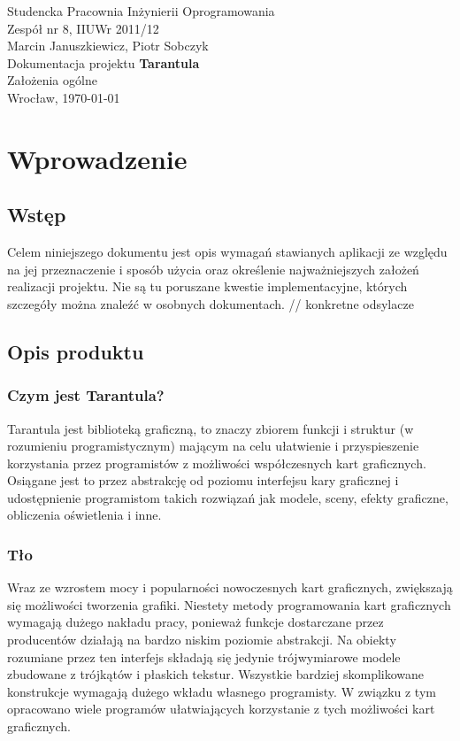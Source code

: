 \documentclass[11pt,leqno]{article}
\begin{document}
\begin{center}
\thispagestyle{empty}
{\Large Studencka Pracownia Inżynierii Oprogramowania}\\[0.5cm]
{\Large Zespół nr 8, IIUWr 2011/12}\\[2.5cm]

{\large Marcin Januszkiewicz, Piotr Sobczyk}\\[0.5cm]
{\huge Dokumentacja projektu \textbf{Tarantula}}\\[0.5cm]
{\huge Założenia ogólne}\\[0.5cm]
\vfill
{\large Wrocław, \today}
\end{center}
\newpage
\tableofcontents

\newpage


\newpage
\section{Wprowadzenie}

\subsection{Wstęp}
\noindent
Celem niniejszego dokumentu jest opis wymagań stawianych aplikacji ze względu na jej przeznaczenie i 
sposób użycia oraz określenie najważniejszych założeń realizacji projektu. 
Nie są tu poruszane kwestie implementacyjne, których szczegóły można znaleźć w osobnych dokumentach. // konkretne odsylacze

\subsection{Opis produktu}

\subsubsection{Czym jest Tarantula?}
\noindent
Tarantula jest biblioteką graficzną, to znaczy zbiorem funkcji i struktur (w rozumieniu programistycznym) mającym 
na celu ułatwienie i przyspieszenie korzystania przez programistów z możliwości współczesnych kart graficznych. Osiągane jest to przez abstrakcję od poziomu interfejsu kary graficznej i udostępnienie programistom takich rozwiązań jak modele, sceny, efekty graficzne, obliczenia oświetlenia i inne.

\subsubsection{Tło}
\noindent
Wraz ze wzrostem mocy i popularności nowoczesnych kart graficznych, zwiększają się możliwości tworzenia grafiki. 
Niestety metody programowania kart graficznych wymagają dużego nakładu pracy, ponieważ funkcje dostarczane przez producentów 
działają na bardzo niskim poziomie abstrakcji. Na obiekty rozumiane przez ten interfejs składają się jedynie trójwymiarowe modele zbudowane z trójkątów i płaskich tekstur. 
Wszystkie bardziej skomplikowane konstrukcje wymagają dużego wkładu własnego programisty. W związku z tym opracowano wiele programów 
ułatwiających korzystanie z tych możliwości kart graficznych. 
\end{document}
